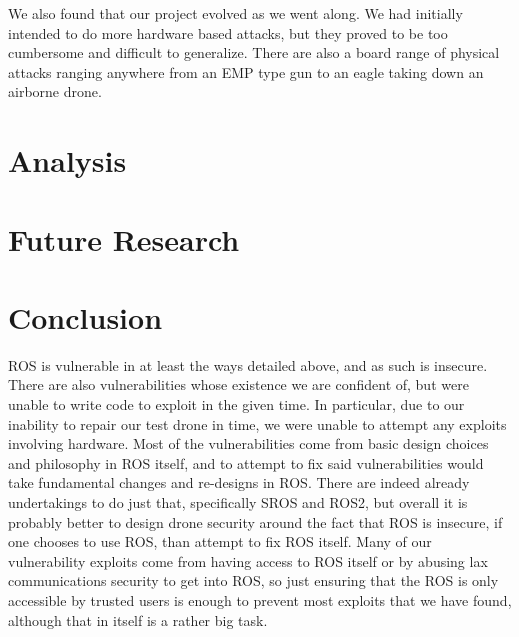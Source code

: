 \documentclass[IEEEtran,letterpaper,10pt,notitlepage,draftclsnofoot,onecolumn]{article}
\begin{document}
We also found that our project evolved as we went along.
We had initially intended to do more hardware based attacks, but they proved to be too cumbersome and difficult to generalize.
There are also a board range of physical attacks ranging anywhere from an EMP type gun to an eagle taking down an airborne drone.

\section{Analysis}

\section{Future Research}

\section{Conclusion}
ROS is vulnerable in at least the ways detailed above, and as such is insecure.
There are also vulnerabilities whose existence we are confident of, but were unable to write code to exploit in the given time.
In particular, due to our inability to repair our test drone in time, we were unable to attempt any exploits involving hardware.
Most of the vulnerabilities come from basic design choices and philosophy in ROS itself, and to attempt to fix said vulnerabilities would take fundamental changes and re-designs in ROS.
There are indeed already undertakings to do just that, specifically SROS and ROS2, but overall it is probably better to design drone security around the fact that ROS is insecure, if one chooses to use ROS, than attempt to fix ROS itself.
Many of our vulnerability exploits come from having access to ROS itself or by abusing lax communications security to get into ROS, so just ensuring that the ROS is only accessible by trusted users is enough to prevent most exploits that we have found, although that in itself is a rather big task.



\end{document}
